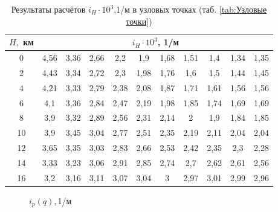     \begin{table}[H]    
    \centering
    \caption{Результаты расчётов $i_H \cdot 10^{3}$,1/м в узловых точках (таб. \ref{tab:Узловые точки})}
    \label{tab:Результаты расчётов $q(H,M),$Н/м$^2$}
    \begin{tabular}{|c|c|c|c|c|c|c|c|c|c|c|}
    \hline
        $H,$ км &\multicolumn{10}{|c|}{$i_H \cdot 10^{3}$, 1/м } \\ \hline
         0 & 4,56 & 3,36 & 2,66 & 2,2 & 1,9 & 1,68 & 1,51 & 1,4 & 1,34 & 1,35  \\ \hline
        2 & 4,43 & 3,34 & 2,72 & 2,3 & 1,98 & 1,76 & 1,6 & 1,5 & 1,44 & 1,45  \\ \hline
        4 & 4,21 & 3,33 & 2,79 & 2,38 & 2,08 & 1,87 & 1,71 & 1,61 & 1,56 & 1,56  \\ \hline
        6 & 4,1 & 3,36 & 2,84 & 2,47 & 2,19 & 1,98 & 1,85 & 1,74 & 1,69 & 1,69  \\ \hline
        8 & 3,9 & 3,32 & 2,89 & 2,56 & 2,31 & 2,14 & 2 & 1,9 & 1,84 & 1,85  \\ \hline
        10 & 3,9 & 3,45 & 3,04 & 2,77 & 2,51 & 2,35 & 2,19 & 2,11 & 2,04 & 2,04  \\ \hline
        12 & 3,65 & 3,35 & 3,03 & 2,83 & 2,66 & 2,53 & 2,42 & 2,35 & 2,3 & 2,28  \\ \hline
        14 & 3,33 & 3,23 & 3,06 & 2,91 & 2,85 & 2,74 & 2,7 & 2,62 & 2,61 & 2,56  \\ \hline
        16 & 3,2 & 3,16 & 3,11 & 3,07 & 3,04 & 3 & 2,97 & 3,01 & 2,99 & 2,96  \\ \hline
    \end{tabular}
\end{table}

\begin{figure}[H]
        \caption{$i_p(q), $1/м}
        \label{fig:i_p}
    \end{figure} 

